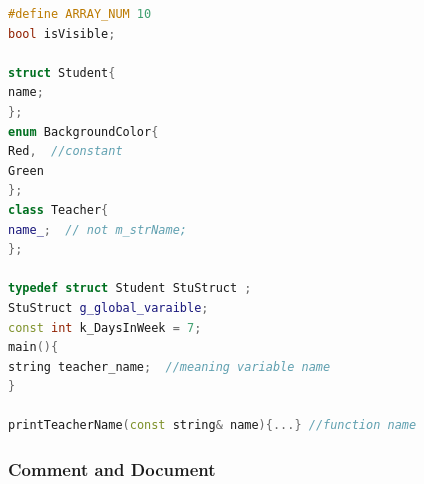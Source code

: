 \documentclass[a4paper,12pt,twoside]{book}
\begin{document}
\begin{lstlisting}[frame=single, language=c++]
#define ARRAY_NUM 10
bool isVisible;

struct Student{
name;
};
enum BackgroundColor{
Red,  //constant
Green
};
class Teacher{
name_;  // not m_strName;  
};

typedef struct Student StuStruct ;
StuStruct g_global_varaible;
const int k_DaysInWeek = 7;
main(){
string teacher_name;  //meaning variable name
}

printTeacherName(const string& name){...} //function name
\end{lstlisting}

\subsubsection{Comment and Document}
\end{document}
